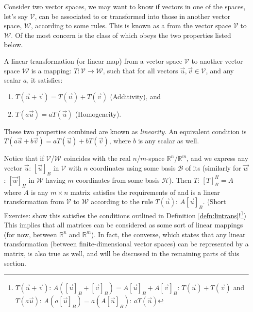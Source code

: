 Consider two vector spaces, we may want to know if vectors in one of the spaces, let's say $\mathcal{V}$, can be associated to or transformed into those in another vector space, $\mathcal{W}$, according to some rules. This is known as a  from the vector space $\mathcal{V}$ to $\mathcal{W}$. Of the most concern is the class of  which obeys the two properties listed below.
\begin{defn}
\label{defn:lintrans}
A linear transformation (or linear map) from a vector space $\mathcal{V}$ to another vector space $\mathcal{W}$ is a mapping: $T: \mathcal{V} \to \mathcal{W}$, such that for all vectors $\vec{u}, \vec{v} \in \mathcal{V}$, and any scalar $a$, it satisfies:
\begin{enumerate}
    \item $T(\vec{u} + \vec{v}) = T(\vec{u}) + T(\vec{v})$ (Additivity), and
    \item $T(a\vec{u}) = aT(\vec{u})$ (Homogeneity).
\end{enumerate}
These two properties combined are known as \textit{linearity}. An equivalent condition is $T(a\vec{u} + b\vec{v}) = aT(\vec{u}) + bT(\vec{v})$, where $b$ is any scalar as well.
\end{defn}
Notice that if $\mathcal{V}$/$\mathcal{W}$ coincides with the real $n$/$m$-space $\mathbb{R}^n$/$\mathbb{R}^m$, and we express any vector $\vec{u}$: $[\vec{u}]_B$ in $\mathcal{V}$ with $n$ coordinates using some basis $\mathcal{B}$ of its (similarly for $\vec{w}$: $ [\vec{w}]_{H}$ in $\mathcal{W}$ having $m$ coordinates from some basis $\mathcal{H}$). Then $T$: $[T]_B^{H} = A$ where $A$ is any $m \times n$ matrix satisfies the requirements of and is a linear transformation from $\mathcal{V}$ to $\mathcal{W}$ according to the rule $T(\vec{u})$: $A[\vec{u}]_B$. (Short Exercise: show this satisfies the conditions outlined in Definition \ref{defn:lintrans}!\footnote{$T(\vec{u}+\vec{v})$: $A([\vec{u}]_B + [\vec{v}]_B) = A[\vec{u}]_B + A[\vec{v}]_B$: $T(\vec{u})+T(\vec{v})$ and $T(a\vec{u})$: $A(a[\vec{u}]_B) = a(A[\vec{u}]_B)$: $aT(\vec{u})$}) This implies that all matrices can be considered as some sort of linear mappings (for now, between $\mathbb{R}^n$ and $\mathbb{R}^m$). In fact, the converse, which states that any linear transformation (between finite-dimensional vector spaces) can be represented by a matrix, is also true as well, and will be discussed in the remaining parts of this section.\\
